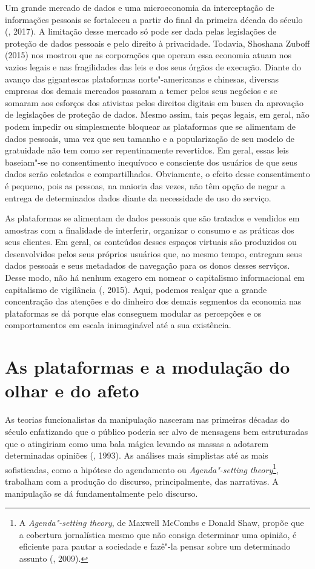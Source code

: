 Um grande mercado de dados e uma microeconomia da interceptação de
informações pessoais se fortaleceu a partir do final da primeira década
do século  (, 2017). A limitação desse mercado só pode ser
dada pelas legislações de proteção de dados pessoais e pelo direito à
privacidade. Todavia, Shoshana Zuboff (2015) nos mostrou que as
corporações que operam essa economia atuam nos vazios legais e nas
fragilidades das leis e dos seus órgãos de execução. Diante do avanço
das gigantescas plataformas norte"-americanas e chinesas, diversas
empresas dos demais mercados passaram a temer pelos seus negócios e se
somaram aos esforços dos ativistas pelos direitos digitais em busca da
aprovação de legislações de proteção de dados. Mesmo assim, tais peças
legais, em geral, não podem impedir ou simplesmente bloquear as
plataformas que se alimentam de dados pessoais, uma vez que seu tamanho
e a popularização de seu modelo de gratuidade não tem como ser
repentinamente revertidos. Em geral, essas leis baseiam"-se no
consentimento inequívoco e consciente dos usuários de que seus dados
serão coletados e compartilhados. Obviamente, o efeito desse
consentimento é pequeno, pois as pessoas, na maioria das vezes, não têm
opção de negar a entrega de determinados dados diante da necessidade de
uso do serviço.

As plataformas se alimentam de dados pessoais que são tratados e
vendidos em amostras com a finalidade de interferir, organizar o consumo
e as práticas dos seus clientes. Em geral, os conteúdos desses espaços
virtuais são produzidos ou desenvolvidos pelos seus próprios usuários
que, ao mesmo tempo, entregam seus dados pessoais e seus metadados de
navegação para os donos desses serviços. Desse modo, não há nenhum
exagero em nomear o capitalismo informacional em capitalismo de
vigilância (, 2015). Aqui, podemos realçar que a grande
concentração das atenções e do dinheiro dos demais segmentos da economia
nas plataformas se dá porque elas conseguem modular as percepções e os
comportamentos em escala inimaginável até a sua existência.

\section{As plataformas e a modulação do olhar e do afeto}

As teorias funcionalistas da manipulação nasceram nas primeiras décadas
do século  enfatizando que o público poderia ser alvo de mensagens bem
estruturadas que o atingiriam como uma bala mágica levando as massas a
adotarem determinadas opiniões (, 1993). As análises mais
simplistas até as mais sofisticadas, como a hipótese do agendamento ou
\emph{Agenda"-setting theory}\footnote{A \emph{Agenda"-setting theory}, de
  Maxwell McCombs e Donald Shaw, propõe que a cobertura jornalística
  mesmo que não consiga determinar uma opinião, é eficiente para pautar a
  sociedade e fazê"-la pensar sobre um determinado assunto (, 2009).}, trabalham com a produção do discurso, principalmente, das narrativas. A manipulação se dá
fundamentalmente pelo discurso.

